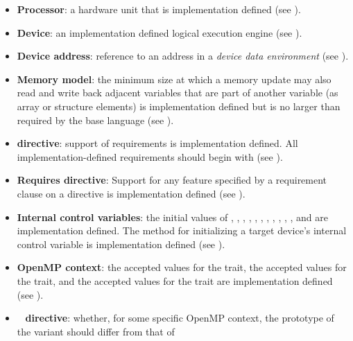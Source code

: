 \begin{itemize}
\item \textbf{Processor}: a hardware unit that is implementation defined (see
      ).
\item \textbf{Device}: an implementation defined logical execution engine (see
      ).
\item \textbf{Device address}: reference to an address in a 
      \emph{device data environment} (see ).
\item \textbf{Memory model}: the minimum size at which a memory update may 
      also read and write back adjacent variables that are part of another 
      variable (as array or structure elements) is implementation defined but 
      is no larger than required by the base language (see 
      ).
\item {} \textbf{directive}: support of requirements is 
      implementation defined. All implementation-defined requirements should 
      begin with  (see ).
\item \textbf{Requires directive}: Support for any feature specified by a
      requirement clause on a  directive is implementation
      defined (see ).
\item \textbf{Internal control variables}: the initial values of
      , , ,
      , , ,
      , ,
      , , 
      ,  and 
       are implementation defined.  The method for
      initializing a target device's internal control variable is
      implementation defined (see ).
\item \textbf{OpenMP context}: the accepted  values for
      the  trait, the accepted  values for the
       trait, and the accepted  values for
      the  trait are implementation defined (see
      ).
\item {}~ \textbf{directive}: whether, for some specific
      OpenMP context, the prototype of the variant should differ from that of

\end{itemize}
